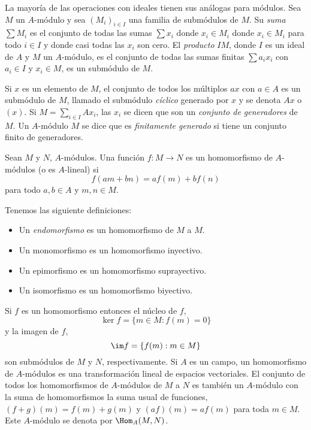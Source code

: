 La mayoría de las operaciones con ideales tienen sus análogas para módulos. Sea $M$ un $A$-módulo y sea $(M_i)_{i\in I}$ una familia de submódulos de $M$. Su \emph{suma} $\sum M_i$ es el conjunto de todas las sumas $\sum x_i$ donde $x_i \in M_i$ donde $x_i \in M_i$ para todo $i \in I$ y donde casi todas las $x_i$ son cero. El \emph{producto} $IM$, donde $I$ es un ideal de $A$ y $M$ un $A$-módulo, es el conjunto de todas las sumas finitas $\sum a_i x_i$ con $a_i \in I$ y $x_i \in M$, es un submódulo de $M$.

Si $x$ es un elemento de $M$, el conjunto de todos los múltiplos $ax$ con $a \in A$ es un submódulo de $M$, llamado el submódulo \emph{cíclico} generado por $x$ y se denota $Ax$ o $(x)$. Si $M = \sum_{i \in I} A x_i$, las $x_i$ se dicen que son un \emph{conjunto de generadores} de $M$. Un $A$-módulo $M$ se dice que es \emph{finitamente generado} si tiene un conjunto finito de generadores.

\begin{definition}
  Sean $M$ y $N$, $A$-módulos. Una función $f\colon M \to N $ es un homomorfismo de $A$-módulos (o es $A$-lineal) si 
    \[
      f(am+bn) = af(m) + bf(n)
    \]
  para todo $a,b \in A$ y $m,n \in M$.
\end{definition}

Tenemos las siguiente definiciones: 
\begin{itemize}
  \item Un \emph{endomorfismo} es un homomorfismo de $M$ a $M$.
  \item Un monomorfismo es un homomorfismo inyectivo.
  \item Un epimorfismo es un homomorfismo suprayectivo.
  \item Un isomorfismo es un homomorfismo biyectivo.
\end{itemize}

Si $f$ es un homomorfismo entonces el núcleo de $f$,
  \[
    \ker f = \{m \in M : f(m) = 0\}
  \]
y la imagen de $f$,
  \[
    \im f = \{f(m) : m \in M\}
  \]
son submódulos de $M$ y $N$, respectivamente. Si $A$ es un campo, un homomorfismo de $A$-módulos es una transformación lineal de espacios vectoriales. El conjunto de todos los homomorfismos de $A$-módulos de $M$ a $N$ es también un $A$-módulo con la suma de homomorfismos la suma usual de funciones, $(f+g)(m) = f(m) + g(m)$ y $(af)(m) = af(m)$ para toda $m \in M$. Este $A$-módulo se denota por $\Hom_A(M,N)$.